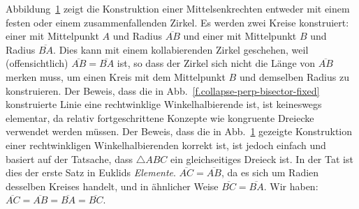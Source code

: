 \begin{figure}[t]
\subfigures
{}\hfill
{}
\label{f.collapse-perp-bisector-fixed}
\label{f.collapse-perp-bisector-collapse}
\end{figure}

Abbildung~\ref{f.collapse-perp-bisector-collapse} zeigt die Konstruktion einer Mittelsenkrechten entweder mit einem festen oder einem zusammenfallenden Zirkel. Es werden zwei Kreise konstruiert: einer mit Mittelpunkt $A$ und Radius $\overline{AB}$ und einer mit Mittelpunkt $B$ und Radius $\overline {BA}$. Dies kann mit einem kollabierenden Zirkel geschehen, weil (offensichtlich) $\overline{AB}=\overline{BA}$ ist, so dass der Zirkel sich nicht die Länge von $\overline{AB}$ merken muss, um einen Kreis mit dem Mittelpunkt $B$ und demselben Radius zu konstruieren.
Der Beweis, dass die in Abb.~\ref{f.collapse-perp-bisector-fixed} konstruierte Linie eine rechtwinklige Winkelhalbierende ist, ist keineswegs elementar, da relativ fortgeschrittene Konzepte wie kongruente Dreiecke verwendet werden müssen. Der Beweis, dass die in Abb.~\ref{f.collapse-perp-bisector-collapse} gezeigte Konstruktion einer rechtwinkligen Winkelhalbierenden korrekt ist, ist jedoch einfach und basiert auf der Tatsache, dass $\triangle ABC$ ein gleichseitiges Dreieck ist. In der Tat ist dies der erste Satz in Euklids \textit{Elemente}.
$\overline{AC}=\overline{AB}$, da es sich um Radien desselben Kreises handelt, und in ähnlicher Weise $\overline{BC}=\overline{BA}$. Wir haben: $
\overline{AC}=\overline{AB}=\overline{BA}=\overline{BC}$.


